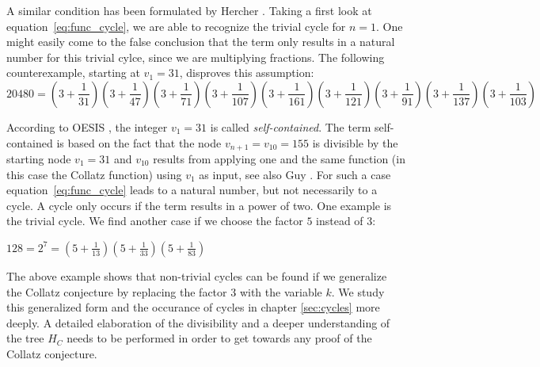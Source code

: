 A similar condition has been formulated by Hercher \cite{Ref_Hercher}. Taking a first look at equation~\ref{eq:func_cycle}, we are able to recognize the trivial cycle for $n=1$. One might easily come to the false conclusion that the term only results in a natural number for this trivial cylce, since we are multiplying fractions. The following counterexample, starting at $v_1=31$, disproves this assumption:
\begin{equation*}
20480=\left(3+\frac{1}{31}\right)\left(3+\frac{1}{47}\right)
\left(3+\frac{1}{71}\right)\left(3+\frac{1}{107}\right)\left(3+\frac{1}{161}\right)\left(3+\frac{1}{121}\right)\left(3+\frac{1}{91}\right)\left(3+\frac{1}{137}\right)\left(3+\frac{1}{103}\right)
\end{equation*}

According to OESIS \cite{Ref_OESIS}, the integer $v_1=31$ is called \textit{self-contained}. The term self-contained is based on the fact that the node $v_{n+1}=v_{10}=155$ is divisible by the starting node $v_1=31$ and $v_{10}$ results from applying one and the same function (in this case the Collatz function) using $v_1$ as input, see also Guy \cite[p.~332]{Ref_Guy}. For such a case equation~\ref{eq:func_cycle} leads to a natural number, but not necessarily to a cycle. A cycle only occurs if the term results in a power of two. One example is the trivial cycle. We find another case if we choose the factor $5$ instead of $3$:
\begin{center}
	$128=2^7=\left(5+\frac{1}{13}\right)\left(5+\frac{1}{33}\right)
	\left(5+\frac{1}{83}\right)$
\end{center}

The above example shows that non-trivial cycles can be found if we generalize the Collatz conjecture by replacing the factor $3$ with the variable $k$. We study this generalized form and the occurance of cycles in chapter \ref{sec:cycles} more deeply. A detailed elaboration of the divisibility and a deeper understanding of the tree $H_C$ needs to be performed in order to get towards any proof of the Collatz conjecture.


